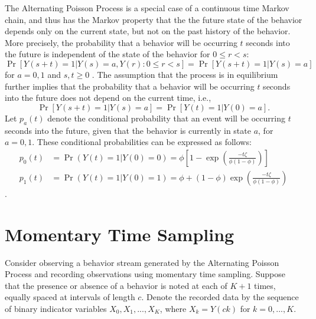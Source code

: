 \documentclass[man, noextraspace, floatsintext]{apa6}\usepackage[]{graphicx}\usepackage[]{color}
\begin{document}
The Alternating Poisson Process is a special case of a continuous time Markov chain, and thus has the Markov property that the the future state of the behavior depends only on the current state, but not on the past history of the behavior. More precisely, the probability that a behavior will be occurring $t$ seconds into the future is independent of the state of the behavior for $0 \leq r < s$: 
\begin{equation}
\label{eq:Markov}
\Pr\left[Y(s + t) = 1 \left| Y(s) = a, Y(r): 0 \leq r < s \right.\right] = \Pr\left[ Y(s + t) = 1 \left| Y(s) = a \right.\right]
\end{equation}
for $a = 0,1$ and $s,t \geq 0$ \citep[Thm. 6.1]{Kulkarni2010modeling}. The assumption that the process is in equilibrium further implies that the probability that a behavior will be occurring $t$ seconds into the future does not depend on the current time, i.e.,  
\begin{equation}
\label{eq:equilibrium}
\Pr\left[Y(s + t) = 1 \left| Y(s) = a\right.\right] = \Pr\left[ Y(t) = 1 \left| Y(0) = a \right.\right].
\end{equation}
Let $p_a(t)$ denote the conditional probability that an event will be occurring $t$ seconds into the future, given that the behavior is currently in state $a$, for $a = 0,1$. These conditional probabilities can be expressed as follows:
\begin{equation}
\begin{aligned}
p_0(t) &= \Pr(Y(t) = 1 | Y(0) = 0) = \phi \left[1 - \exp\left(\frac{- t \zeta}{\phi (1 - \phi)}\right)\right] \\
p_1(t) &= \Pr(Y(t) = 1 | Y(0) = 1) = \phi + (1 - \phi) \exp\left(\frac{- t \zeta}{\phi (1 - \phi)}\right)
\end{aligned}
\end{equation}
\citep[Eq. 6.17]{Kulkarni2010modeling}.

\section{Momentary Time Sampling}
\label{sec:MTS}

Consider observing a behavior stream generated by the Alternating Poisson Process and recording observations using momentary time sampling. Suppose that the presence or absence of a behavior is noted at each of $K+1$ times, equally spaced at intervals of length $c$. Denote the recorded data by the sequence of binary indicator variables $X_0,X_1,...,X_K$, where $X_k = Y(ck)$ for $k = 0,...,K$. 
\end{document}

